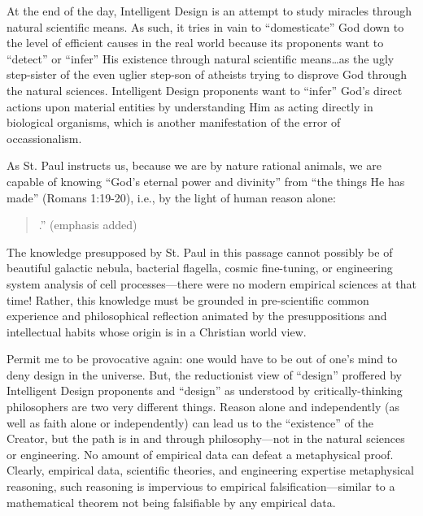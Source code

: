 At the end of the day, Intelligent Design is an attempt to study miracles through natural scientific means. As such, it tries in vain to ``domesticate'' God down to the level of efficient causes in the real world because its proponents want to ``detect'' or ``infer'' His existence  through natural scientific means\ldots as the ugly step-sister of the even uglier step-son of atheists trying to disprove God through the natural sciences. Intelligent Design proponents want to ``infer'' God's direct actions upon material entities by understanding Him as acting directly in biological organisms, which is another manifestation of the error of occassionalism.

As St. Paul instructs us, because we are by nature rational animals, we are capable of knowing ``God's eternal power and divinity'' from ``the things He has made'' (Romans 1:19-20), i.e., by the light of human reason alone:

\begin{quote}
.'' (emphasis added)
\end{quote}

The knowledge presupposed by St. Paul in this passage cannot possibly be of beautiful galactic nebula, bacterial flagella, cosmic fine-tuning, or engineering system analysis of cell processes---there were no modern empirical sciences at that time! Rather, this knowledge must be grounded in pre-scientific common experience and philosophical reflection animated by the presuppositions and intellectual habits whose origin is in a Christian world view.

Permit me to be provocative again: one would have to be out of one's mind to deny design in the universe. But, the reductionist view of ``design'' proffered by Intelligent Design proponents and ``design'' as understood by critically-thinking philosophers are two very different things. Reason alone and independently (as well as faith alone or independently) can lead us to the ``existence'' of the Creator, but the path is in and through philosophy---not in the natural sciences or engineering. No amount of empirical data can defeat a metaphysical proof. Clearly, empirical data, scientific theories, and engineering expertise  metaphysical reasoning, such reasoning is impervious to empirical falsification---similar to a mathematical theorem not being falsifiable by any empirical data.

